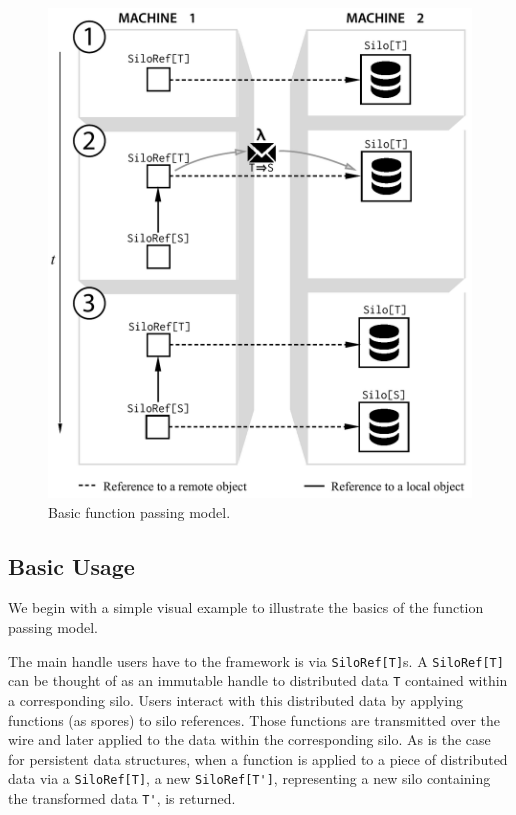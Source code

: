\documentclass{jfp1}
\begin{document}

\begin{figure}[t!]
\centering\includegraphics[width=0.8\columnwidth]{pic/basic-diagram.pdf}
\caption{Basic function passing model.}\label{fig:basic-diagram}
\end{figure}

\subsection{Basic Usage}

We begin with a simple visual example to illustrate the basics of the function
passing model. %

The main handle users have to the framework is via \verb|SiloRef[T]|s. A
\verb|SiloRef[T]| can be thought of as an immutable handle to distributed data
\verb|T| contained within a corresponding silo. Users interact with this
distributed data by applying functions (as spores) to silo references. Those
functions are transmitted over the wire and later applied to the data within the
corresponding silo. As is the case for persistent data structures, when a
function is applied to a piece of distributed data via a \verb|SiloRef[T]|, a
new \verb|SiloRef[T']|, representing a new silo containing the transformed data
\verb|T'|, is returned.
\end{document}
